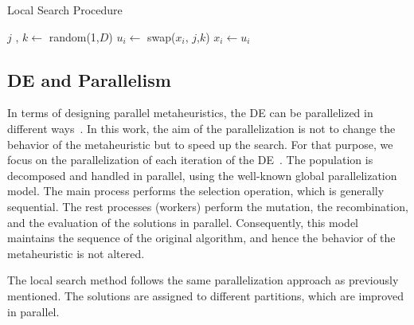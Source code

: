 \begin{algorithm} [!tb]
\scriptsize
    \caption{Local Search Procedure} \label{alg:algoritmoLS} 
    \begin{algorithmic} [1]
                \State $j$ , $k \leftarrow $ random(1,$D$)
                \State $u_{i} \leftarrow $ swap($x_{i}$, $j$,$k$)
                 
                    \State $x_{i} \leftarrow u_{i}$
                \EndIf
            \EndIf
        \EndFor
    \end{algorithmic}
\end{algorithm}

\subsection{DE and Parallelism} \label{subsec:parallelHDE}
\vspace{-0.2cm}
In terms of designing parallel metaheuristics, the DE can be parallelized in different ways~\cite{Talbi}. In this work, the aim of the parallelization is not to change the behavior of the metaheuristic but to speed up the search. For that purpose, we focus on the parallelization of each iteration of the DE~\cite{albaPEA2006}. The population is decomposed and handled in parallel, using the well-known global parallelization model. The main process performs the selection operation, which is generally sequential. The rest processes (workers) perform the mutation, the recombination, and the evaluation of the solutions in parallel. Consequently, this model maintains the sequence of the original algorithm, and hence the behavior of the metaheuristic is not altered.

The local search method follows the same parallelization approach as previously mentioned. The solutions are assigned to different partitions, which are improved in parallel.
